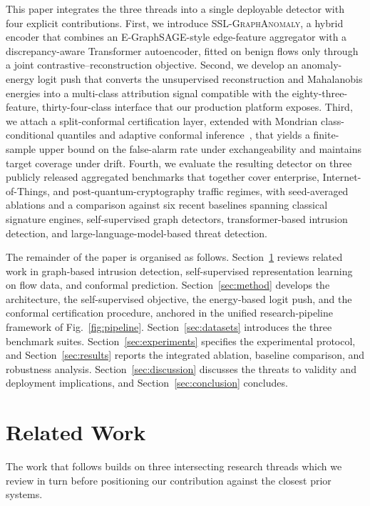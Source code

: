 \documentclass{ieeeaccess}
\begin{document}
This paper integrates the three threads into a single deployable detector
with four explicit contributions. First, we introduce \textsc{SSL-GraphAnomaly},
a hybrid encoder that combines an E-GraphSAGE-style edge-feature aggregator
with a discrepancy-aware Transformer autoencoder, fitted on benign flows
only through a joint contrastive--reconstruction objective. Second, we
develop an anomaly-energy logit push that converts the unsupervised
reconstruction and Mahalanobis energies into a multi-class attribution
signal compatible with the eighty-three-feature, thirty-four-class
interface that our production platform exposes. Third, we attach a
split-conformal certification layer, extended with Mondrian class-conditional
quantiles and adaptive conformal inference~\cite{gibbs2021aci,barber2023nonexch},
that yields a finite-sample upper bound on the false-alarm rate under
exchangeability and maintains target coverage under drift. Fourth, we
evaluate the resulting detector on three publicly released aggregated
benchmarks that together cover enterprise, Internet-of-Things, and
post-quantum-cryptography traffic regimes, with seed-averaged ablations
and a comparison against six recent baselines spanning classical signature
engines, self-supervised graph detectors, transformer-based intrusion
detection, and large-language-model-based threat detection.

The remainder of the paper is organised as follows.
Section~\ref{sec:related} reviews related work in graph-based intrusion
detection, self-supervised representation learning on flow data, and
conformal prediction. Section~\ref{sec:method} develops the architecture,
the self-supervised objective, the energy-based logit push, and the
conformal certification procedure, anchored in the unified
research-pipeline framework of Fig.~\ref{fig:pipeline}.
Section~\ref{sec:datasets} introduces the three benchmark suites.
Section~\ref{sec:experiments} specifies the experimental protocol, and
Section~\ref{sec:results} reports the integrated ablation, baseline
comparison, and robustness analysis. Section~\ref{sec:discussion} discusses
the threats to validity and deployment implications, and
Section~\ref{sec:conclusion} concludes.

\section{Related Work}
\label{sec:related}

The work that follows builds on three intersecting research threads which
we review in turn before positioning our contribution against the closest
prior systems.
\end{document}
